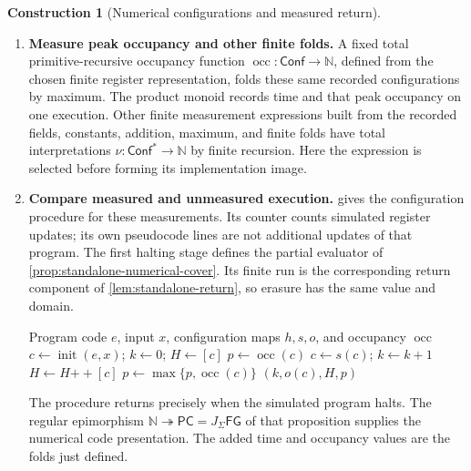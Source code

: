 \documentclass[11pt,a4paper]{article}
\numberwithin{algorithm}{section}
\numberwithin{equation}{section}
\theoremstyle{definition}
\theoremstyle{remark}
\theoremstyle{plain}
\newcommand{\N}{\mathbb N}
\newcommand{\J}{J_{\Sigma}}
\newcommand{\onto}{\twoheadrightarrow}
\theoremstyle{definition}
\newtheorem{construction}[construction]{Construction}
\theoremstyle{plain}
\begin{document}
\begin{construction}[Numerical configurations and measured return]
\begin{enumerate}[leftmargin=*,align=left]
\item \textbf{Measure peak occupancy and other finite folds.}
A fixed total primitive-recursive occupancy function
$\operatorname{occ}:\mathsf{Conf}\to\N$, defined from the chosen finite
register representation, folds these same recorded configurations by
maximum. The product monoid records time and that peak occupancy on one
execution. Other finite measurement expressions built from the recorded
fields, constants, addition, maximum, and finite folds have total
interpretations $\nu:\mathsf{Conf}^*\to\N$ by finite recursion.
Here the expression is selected before forming its implementation image.

\item \textbf{Compare measured and unmeasured execution.}
 gives the configuration procedure for
these measurements. Its counter counts simulated register updates;
its own pseudocode lines are not additional updates of that program.
The first halting stage defines the partial evaluator of
\cref{prop:standalone-numerical-cover}. Its finite run is the
corresponding return component of \cref{lem:standalone-return},
so erasure has the same value and domain.
\begin{algorithm}[H]
\caption{Measured register execution}\label{alg:measured-execution}
\small
\begin{algorithmic}[1]
\Require Program code $e$, input $x$, configuration maps $h,s,o$, and occupancy $\operatorname{occ}$
\State $c\gets\operatorname{init}(e,x)$; $k\gets0$; $H\gets[c]$
\State $p\gets\operatorname{occ}(c)$
  \State $c\gets s(c)$; $k\gets k+1$
  \State $H\gets H{+\!+}[c]$
  \State $p\gets\max\{p,\operatorname{occ}(c)\}$
\EndWhile
\State \Return $(k,o(c),H,p)$
\end{algorithmic}
\end{algorithm}
The procedure returns precisely when the simulated program halts.
The regular epimorphism
$\N\onto\mathsf{PC}=\J\mathsf{FG}$ of that proposition supplies
the numerical code presentation. The added time and occupancy values are
the folds just defined.
\end{enumerate}
\end{construction}
\end{document}

